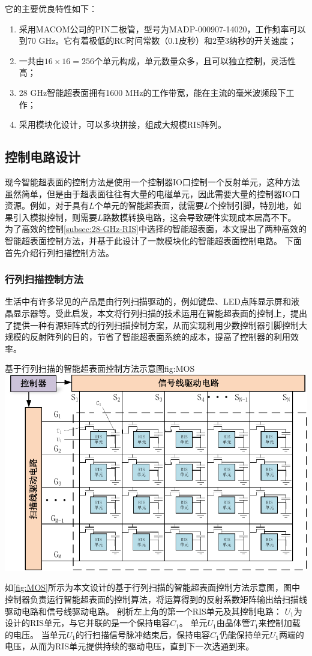 \documentclass[supercite]{HustGraduPaper}
\begin{document}
它的主要优良特性如下：
\begin{enumerate}
	\item 采用MACOM公司的PIN二极管，型号为MADP-000907-14020，工作频率可以到70 GHz。它有着极低的RC时间常数（0.1皮秒）和2至3纳秒的开关速度；
	\item 一共由$16\times16=256$个单元构成，单元数量众多，且可以独立控制，灵活性高；
	\item 28 GHz智能超表面拥有1600 MHz的工作带宽，能在主流的毫米波频段下工作；
	\item 采用模块化设计，可以多块拼接，组成大规模RIS阵列。
\end{enumerate}

\subsection{控制电路设计}

现今智能超表面的控制方法是使用一个控制器IO口控制一个反射单元，这种方法虽然简单，但是由于超表面往往有大量的电磁单元，因此需要大量的控制器IO口资源。例如，对于具有$L$个单元的智能超表面，就需要$L$个控制引脚，特别地，如果引入模拟控制，则需要$L$路数模转换电路，这会导致硬件实现成本居高不下。
为了高效的控制\autoref{subsec:28-GHz-RIS}中选择的智能超表面，本文提出了两种高效的智能超表面控制方法，并基于此设计了一款模块化的智能超表面控制电路。
下面首先介绍行列扫描控制方法。

\subsubsection{行列扫描控制方法}

生活中有许多常见的产品是由行列扫描驱动的，例如键盘、LED点阵显示屏和液晶显示器等。受此启发，本文将行列扫描的技术运用在智能超表面的控制上，提出了提供一种有源矩阵式的行列扫描控制方案，从而实现利用少数控制器引脚控制大规模的反射阵列的目的，节省了智能超表面系统的成本，提高了控制器的利用效率。

\begin{generalfig}[htb]{基于行列扫描的智能超表面控制方法示意图}{fig:MOS}
	\includegraphics[width=0.8\linewidth]{Figures/MOS.pdf}
\end{generalfig}
如\autoref{fig:MOS}所示为本文设计的基于行列扫描的智能超表面控制方法示意图，图中控制器负责运行智能超表面的控制算法，将运算得到的反射系数矩阵输出给扫描线驱动电路和信号线驱动电路。
剖析左上角的第一个RIS单元及其控制电路：
$U_1$为设计的RIS单元，与它并联的是一个保持电容$C_1$。
单元$U_1$由晶体管$T_1$来控制加载的电压。
当单元$U_1$的行扫描信号脉冲结束后，保持电容$C_1$仍能保持单元$U_1$两端的电压，从而为RIS单元提供持续的驱动电压，直到下一次选通到来。
\end{document}
